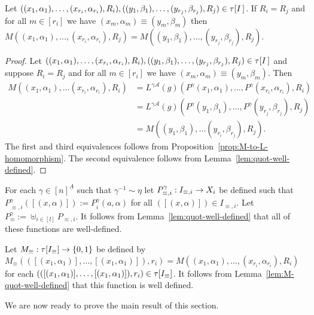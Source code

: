 \documentclass[../main/thesis.tex]{subfiles}
\begin{document}
\begin{lem}
  Let $((x_1, \alpha_1), \ldots, (x_{r_i}, \alpha_{r_i}), R_i), ((y_1, \beta_1),
  \ldots, (y_{r_{j}}, \beta_{r_j}), R_j) \in \tau[I \,]$. If $R_i =
  R_j$ and for all $m \in [r_i]$ we have $(x_m, \alpha_m) \equiv (y_m, \beta_m)$
  then $M((x_1, \alpha_1), \ldots, (x_{r_i}, \alpha_{r_i}), R_j) = M ((y_1,
  \beta_1), \ldots, (y_{r_{j}}, \beta_{r_j}), R_j)$.
  \label{lem:M-quot-well-defined}
\end{lem}
\begin{proof}
  Let $((x_1, \alpha_1), \ldots, (x_{r_i}, \alpha_{r_i}), R_i), ((y_1, \beta_1),
  \ldots, (y_{r_{j}}, \beta_{r_j}), R_j) \in \tau[I \,]$ and suppose
  $R_i = R_j$ and for all $m \in [r_i]$ we have $(x_m, \alpha_m) \equiv (y_m,
  \beta_m)$. Then
  \begin{align*}
    M((x_1, \alpha_1), \ldots (x_{r_i}, \alpha_{r_i}), R_i)  &= L^{\gamma \mathcal{A}}(g)(P^{\gamma}(x_1, \alpha_1), \ldots, P^{\gamma}(x_{r_i}, \alpha_{r_i}), R_i)\\
                                                             &= L^{\gamma \mathcal{A}}(g)(P^{\gamma}(y_1, \beta_1), \ldots, P^{\gamma}(y_{r_j}, \beta_{r_j}), R_j) \\
                                                             &= M((y_1, \beta_1), \ldots (y_{r_i}, \beta_{r_j}), R_j).
  \end{align*}
  The first and third equivalences follows from
  Proposition~\ref{prop:M-to-L-homomorphism}. The second equivalence follows
  from Lemma~\ref{lem:quot-well-defined}.
\end{proof}

For each $\gamma \in [n]^{\underline{A}}$ such that $\gamma^{-1} \sim \eta$ let
$P^{\gamma}_{\equiv, i}: I_{\equiv, i}\rightarrow X_i$ be defined such that
$P^{\gamma}_{\equiv, i} ([(x, \alpha)]) := P^{\gamma}_i (a, \alpha)$ for all
$([(x, \alpha)]) \in I_{\equiv, i}$. Let $P^{\gamma}_{\equiv} := \uplus_{i \in
  [l]}P_{\equiv, i}$. It follows from Lemma~\ref{lem:quot-well-defined} that all
of these functions are well-defined.

Let $M_\equiv : \tau[I_\equiv] \rightarrow \{0,1\}$ be defined by $M_{\equiv}
(([(x_1, \alpha_1)], \ldots, [(x_1, \alpha_1)]), r_i) = M((x_1, \alpha_1),
\ldots, (x_{r_i}, \alpha_{r_i}), R_i)$ for each $(([(x_1, \alpha_1)], \ldots,
[(x_1, \alpha_1)]), r_i) \in \tau[I_\equiv]$. It follows from
Lemma~\ref{lem:M-quot-well-defined} that this function is well defined.

We are now ready to prove the main result of this section.
\end{document}
